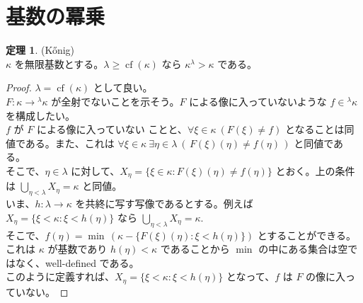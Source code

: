 \documentclass{jsarticle}
\theoremstyle{definition}
\newtheorem{theorem}{定理}[section]
\begin{document}
    \newpage
    \section{基数の冪乗}
    \begin{theorem} \label{Konigs_lemma} (Kőnig) \\
        $\kappa$ を無限基数とする。$\lambda \geq \operatorname{cf}(\kappa)$ なら $\kappa^\lambda > \kappa$ である。
    \end{theorem}
    \begin{proof}
        $\lambda = \operatorname{cf}(\kappa)$ として良い。\\
        $F : \kappa \rightarrow {^\lambda\kappa}$ が全射でないことを示そう。$F$ による像に入っていないような $f \in {^\lambda\kappa}$ を構成したい。\\
        $f$ が $F$ による像に入っていない ことと、$\forall \xi \in \kappa \ (F(\xi) \neq f)$ となることは同値である。また、これは $\forall \xi \in \kappa \ \exists \eta \in \lambda \ (\,F(\xi)(\eta) \neq f(\eta)\,)$ と同値である。\\
        そこで、$\eta \in \lambda$ に対して、$X_\eta = \{\xi \in \kappa : F(\xi)(\eta) \neq f(\eta)\}$ とおく。上の条件は $\bigcup_{\eta < \lambda} X_\eta = \kappa$ と同値。\\
        いま、$h : \lambda \rightarrow \kappa$ を共終に写す写像であるとする。例えば $X_\eta = \{\xi < \kappa : \xi < h(\eta)\}$ なら $\displaystyle \bigcup_{\eta < \lambda} X_\eta = \kappa.$\\
        そこで、$f(\eta) = \min \, (\kappa - \{F(\xi)(\eta) : \xi < h(\eta)\})$ とすることができる。これは $\kappa$ が基数であり $h(\eta) < \kappa$ であることから $\min$ の中にある集合は空ではなく、well-defined である。\\
        このように定義すれば、$X_\eta = \{\xi < \kappa : \xi < h(\eta)\}$ となって、$f$ は $F$ の像に入っていない。
    \end{proof}
    
\end{document}
